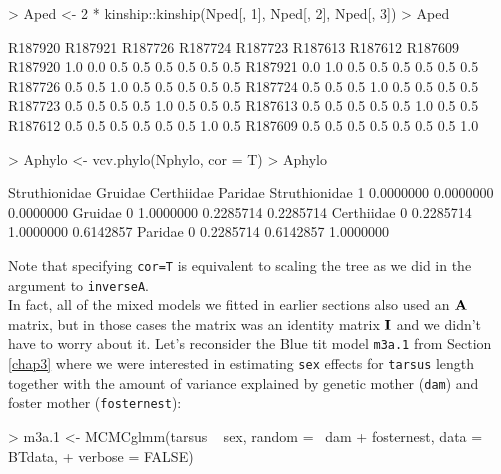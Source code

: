 \documentclass{article}
\begin{document}
\begin{Schunk}
\begin{Sinput}
> Aped <- 2 * kinship::kinship(Nped[, 1], Nped[, 2], Nped[, 3])
> Aped
\end{Sinput}
\begin{Soutput}
        R187920 R187921 R187726 R187724 R187723 R187613 R187612 R187609
R187920     1.0     0.0     0.5     0.5     0.5     0.5     0.5     0.5
R187921     0.0     1.0     0.5     0.5     0.5     0.5     0.5     0.5
R187726     0.5     0.5     1.0     0.5     0.5     0.5     0.5     0.5
R187724     0.5     0.5     0.5     1.0     0.5     0.5     0.5     0.5
R187723     0.5     0.5     0.5     0.5     1.0     0.5     0.5     0.5
R187613     0.5     0.5     0.5     0.5     0.5     1.0     0.5     0.5
R187612     0.5     0.5     0.5     0.5     0.5     0.5     1.0     0.5
R187609     0.5     0.5     0.5     0.5     0.5     0.5     0.5     1.0
\end{Soutput}
\end{Schunk}

\begin{Schunk}
\begin{Sinput}
> Aphylo <- vcv.phylo(Nphylo, cor = T)
> Aphylo
\end{Sinput}
\begin{Soutput}
              Struthionidae   Gruidae Certhiidae   Paridae
Struthionidae             1 0.0000000  0.0000000 0.0000000
Gruidae                   0 1.0000000  0.2285714 0.2285714
Certhiidae                0 0.2285714  1.0000000 0.6142857
Paridae                   0 0.2285714  0.6142857 1.0000000
\end{Soutput}
\end{Schunk}

Note that specifying \texttt{cor=T} is equivalent to scaling the tree as we did in the argument to \texttt{inverseA}.\\

In fact, all of the mixed models we fitted in earlier sections also used an ${\bf A}$ matrix, but in those cases the matrix was an identity matrix ${\bf I}$ and we didn't have to worry about it. Let's reconsider the Blue tit model \texttt{m3a.1} from Section \ref{chap3} where we were interested in estimating \texttt{sex} effects for \texttt{tarsus} length together with the amount of variance explained by genetic mother (\texttt{dam}) and  foster mother  (\texttt{fosternest}):

\begin{Schunk}
\begin{Sinput}
> m3a.1 <- MCMCglmm(tarsus ~ sex, random = ~dam + fosternest, data = BTdata, 
+     verbose = FALSE)
\end{Sinput}
\end{Schunk}
\end{document}
